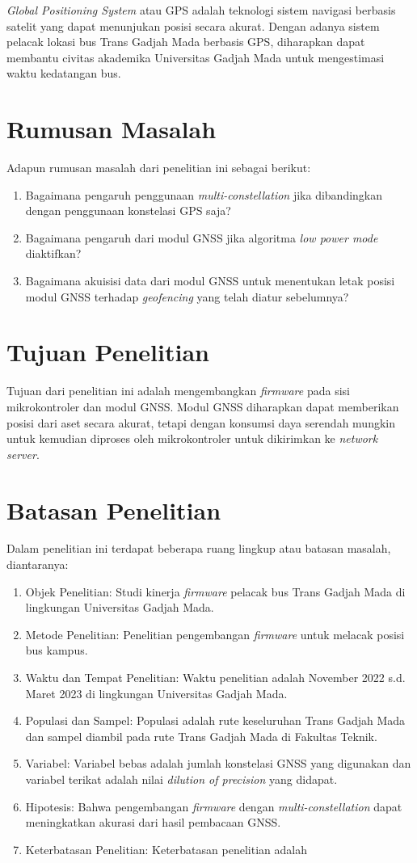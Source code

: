 \textit{Global Positioning System} atau GPS adalah teknologi sistem navigasi berbasis satelit yang dapat menunjukan posisi secara akurat. Dengan adanya sistem pelacak lokasi bus Trans Gadjah Mada berbasis GPS, diharapkan dapat membantu civitas akademika Universitas Gadjah Mada untuk mengestimasi waktu kedatangan bus.

\section{Rumusan Masalah}
Adapun rumusan masalah dari penelitian ini sebagai berikut:
\begin{enumerate}
	\item Bagaimana pengaruh penggunaan \textit{multi-constellation} jika dibandingkan dengan penggunaan konstelasi GPS saja?
	\item Bagaimana pengaruh dari modul GNSS jika algoritma \textit{low power mode} diaktifkan?
	\item Bagaimana akuisisi data dari modul GNSS untuk menentukan letak posisi modul GNSS terhadap \textit{geofencing} yang telah diatur sebelumnya?
\end{enumerate}

\section{Tujuan Penelitian}
Tujuan dari penelitian ini adalah mengembangkan \textit{firmware} pada sisi mikrokontroler dan modul GNSS. Modul GNSS diharapkan dapat memberikan posisi dari aset secara akurat, tetapi dengan konsumsi daya serendah mungkin untuk kemudian diproses oleh mikrokontroler untuk dikirimkan ke \textit{network server}.	

\section{Batasan Penelitian}
Dalam penelitian ini terdapat beberapa ruang lingkup atau batasan masalah, diantaranya:
\begin{enumerate}
	\item Objek Penelitian: Studi kinerja \textit{firmware} pelacak bus Trans Gadjah Mada di lingkungan Universitas Gadjah Mada.
	\item Metode Penelitian: Penelitian pengembangan \textit{firmware} untuk melacak posisi bus kampus.
	\item Waktu dan Tempat Penelitian: Waktu penelitian adalah November 2022 s.d. Maret 2023 di lingkungan Universitas Gadjah Mada.
	\item Populasi dan Sampel: Populasi adalah rute keseluruhan Trans Gadjah Mada dan sampel diambil pada rute Trans Gadjah Mada di Fakultas Teknik.
	\item Variabel: Variabel bebas adalah jumlah konstelasi GNSS yang digunakan dan variabel terikat adalah nilai \textit{dilution of precision} yang didapat.
	\item Hipotesis: Bahwa pengembangan \textit{firmware} dengan \textit{multi-constellation} dapat meningkatkan akurasi dari hasil pembacaan GNSS.
	\item Keterbatasan Penelitian: Keterbatasan penelitian adalah 
\end{enumerate}

